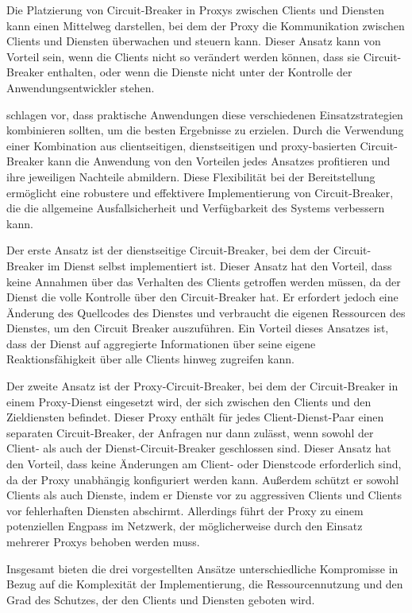 Die Platzierung von Circuit-Breaker in Proxys zwischen Clients und Diensten
kann einen Mittelweg darstellen,
bei dem der Proxy die Kommunikation zwischen Clients und Diensten überwachen und steuern kann.
Dieser Ansatz kann von Vorteil sein, wenn die Clients nicht so verändert werden können,
dass sie Circuit-Breaker enthalten, oder wenn die Dienste nicht unter der Kontrolle der Anwendungsentwickler stehen.

\citet{Montesi.19.09.2016} schlagen vor, dass praktische Anwendungen diese verschiedenen Einsatzstrategien
kombinieren sollten, um die besten Ergebnisse zu erzielen.
Durch die Verwendung einer Kombination aus clientseitigen, dienstseitigen und proxy-basierten Circuit-Breaker
kann die Anwendung von den Vorteilen jedes Ansatzes profitieren und ihre jeweiligen Nachteile abmildern.
Diese Flexibilität bei der Bereitstellung ermöglicht eine robustere und effektivere Implementierung von Circuit-Breaker,
die die allgemeine Ausfallsicherheit und Verfügbarkeit des Systems verbessern kann.


Der erste Ansatz ist der dienstseitige Circuit-Breaker, bei dem der Circuit-Breaker im Dienst selbst implementiert ist.
Dieser Ansatz hat den Vorteil, dass keine Annahmen über das Verhalten des Clients getroffen werden müssen,
da der Dienst die volle Kontrolle über den Circuit-Breaker hat.
Er erfordert jedoch eine Änderung des Quellcodes des Dienstes und verbraucht die eigenen Ressourcen des Dienstes,
um den Circuit Breaker auszuführen.
Ein Vorteil dieses Ansatzes ist, dass der Dienst auf aggregierte Informationen über seine eigene Reaktionsfähigkeit
über alle Clients hinweg zugreifen kann.

Der zweite Ansatz ist der Proxy-Circuit-Breaker,
bei dem der Circuit-Breaker in einem Proxy-Dienst eingesetzt wird, der sich zwischen den Clients und den
Zieldiensten befindet.
Dieser Proxy enthält für jedes Client-Dienst-Paar einen separaten Circuit-Breaker, der Anfragen nur dann zulässt,
wenn sowohl der Client- als auch der Dienst-Circuit-Breaker geschlossen sind.
Dieser Ansatz hat den Vorteil, dass keine Änderungen am Client- oder Dienstcode erforderlich sind,
da der Proxy unabhängig konfiguriert werden kann.
Außerdem schützt er sowohl Clients als auch Dienste, indem er Dienste vor zu aggressiven Clients und Clients
vor fehlerhaften Diensten abschirmt.
Allerdings führt der Proxy zu einem potenziellen Engpass im Netzwerk,
der möglicherweise durch den Einsatz mehrerer Proxys behoben werden muss.

Insgesamt bieten die drei vorgestellten Ansätze unterschiedliche Kompromisse in Bezug auf die Komplexität der Implementierung,
die Ressourcennutzung und den Grad des Schutzes, der den Clients und Diensten geboten wird.

